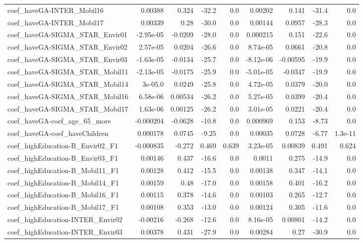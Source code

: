 \begin{tabular}{lrrrrrrrr}
coef_haveGA-INTER_Mobil16 & 0.00388 & 0.324 & -32.2 & 0.0 & 0.00202 & 0.141 & -31.4 & 0.0 \\
coef_haveGA-INTER_Mobil17 & 0.00339 & 0.28 & -30.0 & 0.0 & 0.00144 & 0.0957 & -28.3 & 0.0 \\
coef_haveGA-SIGMA_STAR_Envir01 & -2.95e-05 & -0.0209 & -28.0 & 0.0 & 0.000215 & 0.151 & -22.6 & 0.0 \\
coef_haveGA-SIGMA_STAR_Envir02 & 2.57e-05 & 0.0204 & -26.6 & 0.0 & 8.74e-05 & 0.0661 & -20.8 & 0.0 \\
coef_haveGA-SIGMA_STAR_Envir03 & -1.63e-05 & -0.0134 & -25.7 & 0.0 & -8.12e-06 & -0.00595 & -19.9 & 0.0 \\
coef_haveGA-SIGMA_STAR_Mobil11 & -2.13e-05 & -0.0175 & -25.9 & 0.0 & -5.01e-05 & -0.0347 & -19.9 & 0.0 \\
coef_haveGA-SIGMA_STAR_Mobil14 & 3e-05.0 & 0.0249 & -25.8 & 0.0 & 4.72e-05 & 0.0379 & -20.0 & 0.0 \\
coef_haveGA-SIGMA_STAR_Mobil16 & 6.58e-06 & 0.00534 & -26.2 & 0.0 & 5.27e-05 & 0.0399 & -20.4 & 0.0 \\
coef_haveGA-SIGMA_STAR_Mobil17 & 1.63e-06 & 0.00125 & -26.2 & 0.0 & 3.01e-05 & 0.0221 & -20.4 & 0.0 \\
coef_haveGA-coef_age_65_more & -0.000204 & -0.0628 & -10.8 & 0.0 & 0.000969 & 0.153 & -8.73 & 0.0 \\
coef_haveGA-coef_haveChildren & 0.000178 & 0.0745 & -9.25 & 0.0 & 0.00035 & 0.0728 & -6.77 & 1.3e-11 \\
coef_highEducation-B_Envir02_F1 & -0.000835 & -0.272 & 0.469 & 0.639 & 3.23e-05 & 0.00839 & 0.491 & 0.624 \\
coef_highEducation-B_Envir03_F1 & 0.00146 & 0.437 & -16.6 & 0.0 & 0.0011 & 0.275 & -14.9 & 0.0 \\
coef_highEducation-B_Mobil11_F1 & 0.00128 & 0.412 & -15.5 & 0.0 & 0.00138 & 0.347 & -14.1 & 0.0 \\
coef_highEducation-B_Mobil14_F1 & 0.00159 & 0.48 & -17.0 & 0.0 & 0.00158 & 0.401 & -16.2 & 0.0 \\
coef_highEducation-B_Mobil16_F1 & 0.00115 & 0.378 & -14.6 & 0.0 & 0.00103 & 0.265 & -12.7 & 0.0 \\
coef_highEducation-B_Mobil17_F1 & 0.00108 & 0.353 & -13.0 & 0.0 & 0.00124 & 0.305 & -11.6 & 0.0 \\
coef_highEducation-INTER_Envir02 & -0.00216 & -0.268 & -12.6 & 0.0 & 8.16e-05 & 0.00801 & -14.2 & 0.0 \\
coef_highEducation-INTER_Envir03 & 0.00378 & 0.431 & -27.9 & 0.0 & 0.00284 & 0.27 & -30.9 & 0.0 \\

\end{tabular}
